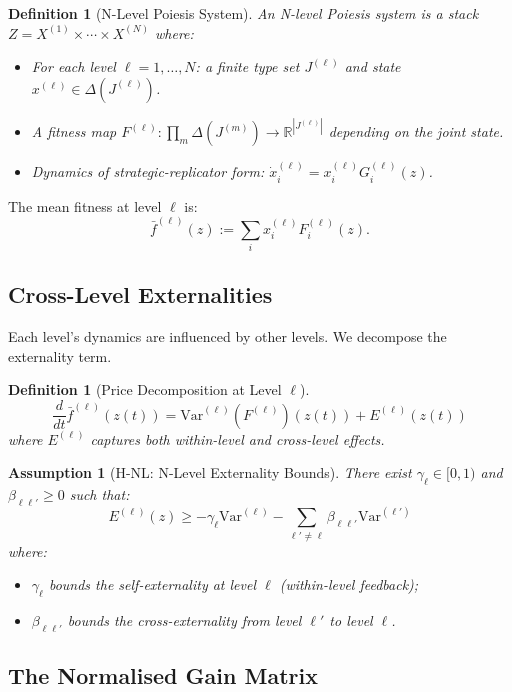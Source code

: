 \documentclass[12pt]{article}
\newtheorem{definition}[theorem]{Definition}
\newtheorem{assumption}[theorem]{Assumption}
\newcommand{\R}{\mathbb{R}}
\newcommand{\Var}{\mathrm{Var}}
\begin{document}
\begin{definition}[N-Level Poiesis System]
An \emph{N-level Poiesis system} is a stack $Z = X^{(1)} \times \cdots \times X^{(N)}$ where:
\begin{itemize}
    \item For each level $\ell = 1, \ldots, N$: a finite type set $J^{(\ell)}$ and state $x^{(\ell)} \in \Delta(J^{(\ell)})$.
    \item A fitness map $F^{(\ell)}: \prod_m \Delta(J^{(m)}) \to \R^{|J^{(\ell)}|}$ depending on the joint state.
    \item Dynamics of strategic-replicator form: $\dot{x}^{(\ell)}_i = x^{(\ell)}_i G^{(\ell)}_i(z)$.
\end{itemize}
\end{definition}

The mean fitness at level $\ell$ is:
\[
\bar{f}^{(\ell)}(z) := \sum_i x^{(\ell)}_i F^{(\ell)}_i(z).
\]

\subsection{Cross-Level Externalities}

Each level's dynamics are influenced by other levels. We decompose the externality term.

\begin{definition}[Price Decomposition at Level $\ell$]
\[
\frac{d}{dt} \bar{f}^{(\ell)}(z(t)) = \Var^{(\ell)}(F^{(\ell)})(z(t)) + E^{(\ell)}(z(t))
\]
where $E^{(\ell)}$ captures both within-level and cross-level effects.
\end{definition}

\begin{assumption}[H-NL: N-Level Externality Bounds]
\label{ass:h-nl}
There exist $\gamma_\ell \in [0, 1)$ and $\beta_{\ell\ell'} \geq 0$ such that:
\[
E^{(\ell)}(z) \geq -\gamma_\ell \Var^{(\ell)} - \sum_{\ell' \neq \ell} \beta_{\ell\ell'} \Var^{(\ell')}
\]
where:
\begin{itemize}
    \item $\gamma_\ell$ bounds the self-externality at level $\ell$ (within-level feedback);
    \item $\beta_{\ell\ell'}$ bounds the cross-externality from level $\ell'$ to level $\ell$.
\end{itemize}
\end{assumption}

\subsection{The Normalised Gain Matrix}
\end{document}
